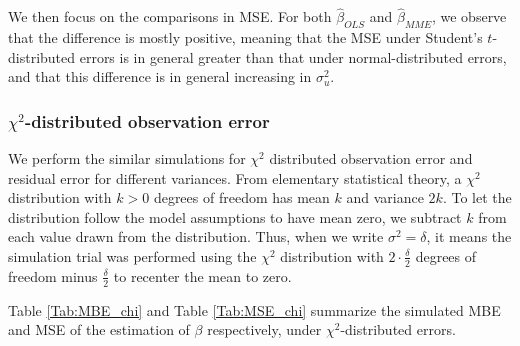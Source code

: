 \documentclass{article}
\begin{document}
We then focus on the comparisons in MSE.
For both $\hat{\beta}_{OLS}$ and $\hat{\beta}_{MME}$, we observe that the difference is mostly positive,
meaning that the MSE under Student's $t$-distributed errors is in general greater than that under normal-distributed errors,
and that this difference is in general increasing in $\sigma^2_u$.

\subsubsection{$\chi^2$-distributed observation error}

We perform the similar simulations for $\chi^2$ distributed observation error and residual error for different variances.
From elementary statistical theory, a $\chi^2$ distribution with $k > 0$ degrees of freedom has mean $k$ and variance $2k$.
To let the distribution follow the model assumptions to have mean zero, we subtract $k$ from each value drawn from the distribution.
Thus, when we write $\sigma^2 = \delta$, it means the simulation trial was performed using the $\chi^2$ distribution with $2 \cdot \frac{\delta}{2}$ degrees of freedom minus $\frac{\delta}{2}$ to recenter the mean to zero.

Table \ref{Tab:MBE_chi} and Table \ref{Tab:MSE_chi} summarize the simulated MBE and MSE of the estimation of $\beta$ respectively, under $\chi^2$-distributed errors.
\end{document}
